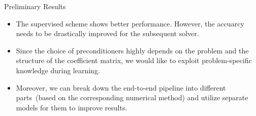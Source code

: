 \documentclass[aspectratio=169]{beamer}
\begin{document}
\begin{frame}{Preliminary Results}
    \begin{itemize}
        \item The supervised scheme shows better performance. However, the accuarcy needs to be drastically improved for the subsequent solver.
        \item  Since the choice of preconditioners highly depends on the problem and the structure of the coefficient matrix, we would like to exploit problem-specific knowledge during learning.
        \item Moreover, we can break down the end-to-end pipeline into different parts~(based on the corresponding numerical method) and utilize separate models for them to improve results.
    \end{itemize}
\end{frame}
\end{document}
